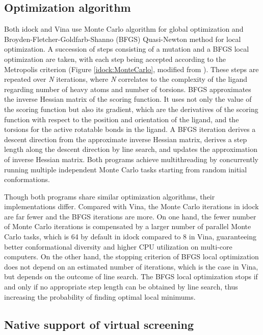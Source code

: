 \subsection{Optimization algorithm}

Both idock and Vina use Monte Carlo algorithm for global optimization and Broyden-Fletcher-Goldfarb-Shanno (BFGS) \cite{786} Quasi-Newton method for local optimization. A succession of steps consisting of a mutation and a BFGS local optimization are taken, with each step being accepted according to the Metropolis criterion (Figure \ref{idock:MonteCarlo}, modified from \cite{493}). These steps are repeated over \textit{N} iterations, where \textit{N} correlates to the complexity of the ligand regarding number of heavy atoms and number of torsions. BFGS approximates the inverse Hessian matrix of the scoring function. It uses not only the value of the scoring function but also its gradient, which are the derivatives of the scoring function with respect to the position and orientation of the ligand, and the torsions for the active rotatable bonds in the ligand. A BFGS iteration derives a descent direction from the approximate inverse Hessian matrix, derives a step length along the descent direction by line search, and updates the approximation of inverse Hessian matrix. Both programs achieve multithreading by concurrently running multiple independent Monte Carlo tasks starting from random initial conformations.

Though both programs share similar optimization algorithms, their implementations differ. Compared with Vina, the Monte Carlo iterations in idock are far fewer and the BFGS iterations are more. On one hand, the fewer number of Monte Carlo iterations is compensated by a larger number of parallel Monte Carlo tasks, which is 64 by default in idock compared to 8 in Vina, guaranteeing better conformational diversity and higher CPU utilization on multi-core computers. On the other hand, the stopping criterion of BFGS local optimization does not depend on an estimated number of iterations, which is the case in Vina, but depends on the outcome of line search. The BFGS local optimization stops if and only if no appropriate step length can be obtained by line search, thus increasing the probability of finding optimal local minimums.

\subsection{Native support of virtual screening}

